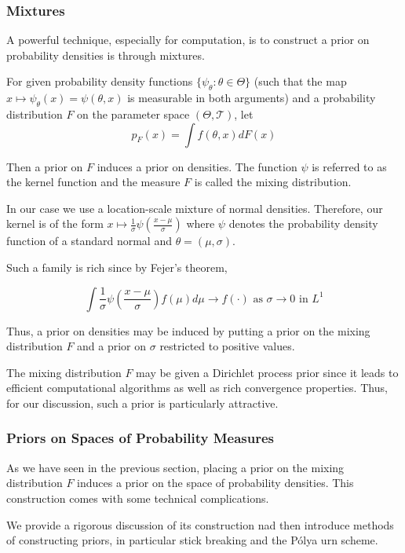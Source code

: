 \documentclass[a4paper,11pt]{article}
\theoremstyle{theorem}
\theoremstyle{definition}
\begin{document}
\subsubsection{Mixtures} \label{mixtures}

A powerful technique, especially for computation, is to construct a prior on probability densities is through mixtures.

For given probability density functions $\{ \psi_{\theta} : \theta \in \Theta\}$ (such that the map $x \mapsto \psi_{\theta}(x) = \psi(\theta, x)$ is measurable in both arguments) and a probability distribution $F$ on the parameter space $(\Theta, \mathcal{T})$, let
\[
p_{F}(x) = \int{f(\theta, x) dF(x)}
\]

Then a prior on $F$ induces a prior on densities. The function $\psi$ is referred to as the kernel function and the measure $F$ is called the mixing distribution. 

In our case we use a location-scale mixture of normal densities. Therefore, our kernel is of the form $x \mapsto \frac{1}{\sigma}\psi\left(\frac{x- \mu}{\sigma}\right)$ where $\psi$ denotes the probability density function of a standard normal and $\theta = (\mu, \sigma)$.

Such a family is rich since by Fejer's theorem,

\[
\int{\frac{1}{\sigma}\psi\left(\frac{x- \mu}{\sigma}\right) f(\mu)d\mu} \to f(\cdot) \text{ as } \sigma \to 0 \text{ in } L^1
\]

Thus, a prior on densities may be induced by putting a prior on the mixing distribution $F$ and a prior on $\sigma$ restricted to positive values.

The mixing distribution $F$ may be given a Dirichlet process prior since it leads to efficient computational algorithms as well as rich convergence properties. Thus, for our discussion, such a prior is particularly attractive. 

\subsubsection{Priors on Spaces of Probability Measures}

As we have seen in the previous section, placing a prior on the mixing distribution $F$ induces a prior on the space of probability densities. This construction comes with some technical complications.

We provide a rigorous discussion of its construction nad then introduce methods of constructing priors, in particular stick breaking and the P\'{o}lya urn scheme.
\end{document}
